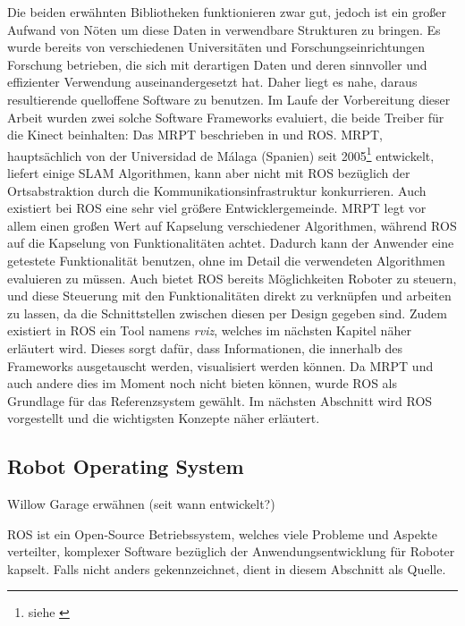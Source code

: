 Die beiden erwähnten Bibliotheken funktionieren zwar gut, jedoch ist ein großer Aufwand von Nöten um diese Daten in verwendbare Strukturen zu bringen. Es wurde bereits von verschiedenen Universitäten und Forschungseinrichtungen {\color{red}Forschung} betrieben, die sich mit derartigen Daten und deren sinnvoller und effizienter Verwendung auseinandergesetzt hat. Daher liegt es nahe, daraus resultierende quelloffene Software zu benutzen. Im Laufe der Vorbereitung dieser Arbeit wurden zwei solche Software Frameworks evaluiert, die beide Treiber für die Kinect beinhalten: Das \gls{MRPT} beschrieben in \cite{online:mrpt} und \gls{ROS}. \gls{MRPT}, hauptsächlich von der Universidad de Málaga (Spanien) seit 2005\footnote{siehe \cite{online:mrptentwickler}} entwickelt, liefert einige \gls{SLAM} Algorithmen, kann aber nicht mit \gls{ROS} bezüglich der Ortsabstraktion durch die Kommunikationsinfrastruktur konkurrieren. Auch existiert bei \gls{ROS} eine sehr viel größere Entwicklergemeinde. \gls{MRPT} legt vor allem einen großen Wert auf Kapselung verschiedener Algorithmen, während \gls{ROS} auf die Kapselung von Funktionalitäten achtet. Dadurch kann der Anwender eine getestete Funktionalität benutzen, ohne im Detail die verwendeten Algorithmen evaluieren zu müssen. Auch bietet \gls{ROS} bereits Möglichkeiten Roboter zu steuern, und diese Steuerung mit den Funktionalitäten direkt zu verknüpfen und arbeiten zu lassen, da die Schnittstellen zwischen diesen per Design gegeben sind. Zudem existiert in \gls{ROS} ein Tool namens \emph{rviz}, welches im nächsten Kapitel näher erläutert wird. Dieses sorgt dafür, dass Informationen, die innerhalb des Frameworks ausgetauscht werden, visualisiert werden können. Da \gls{MRPT} und auch andere dies im Moment noch nicht bieten können, wurde \gls{ROS} als Grundlage für das Referenzsystem gewählt. Im nächsten Abschnitt wird \gls{ROS} vorgestellt und die wichtigsten Konzepte näher erläutert.

\subsection{Robot Operating System}

{\color{red}Willow Garage erwähnen (seit wann entwickelt?)}

\gls{ROS} ist ein Open-Source Betriebssystem, welches viele Probleme und Aspekte verteilter, komplexer Software bezüglich der Anwendungsentwicklung für Roboter kapselt. Falls nicht anders gekennzeichnet, dient \cite{Quigley:2009kx} in diesem Abschnitt als Quelle.

